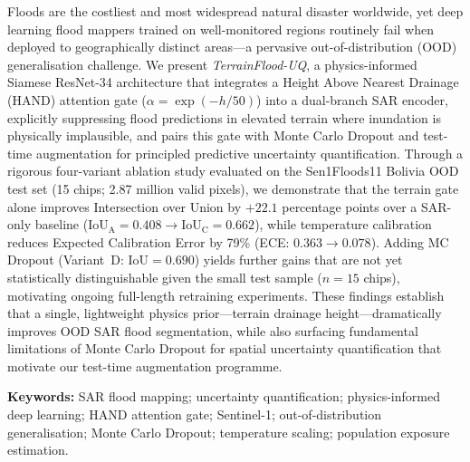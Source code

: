 \documentclass[12pt]{article}
\newcommand{\IoU}{\mathrm{IoU}}
\begin{document}
Floods are the costliest and most widespread natural disaster worldwide, yet
deep learning flood mappers trained on well-monitored regions routinely fail
when deployed to geographically distinct areas—a pervasive out-of-distribution
(OOD) generalisation challenge.
%
We present \textit{TerrainFlood-UQ}, a physics-informed Siamese ResNet-34
architecture that integrates a Height Above Nearest Drainage (HAND) attention
gate ($\alpha = \exp(-h/50)$) into a dual-branch SAR encoder, explicitly
suppressing flood predictions in elevated terrain where inundation is
physically implausible, and pairs this gate with Monte Carlo Dropout and
test-time augmentation for principled predictive uncertainty quantification.
%
Through a rigorous four-variant ablation study evaluated on the Sen1Floods11
Bolivia OOD test set (15 chips; 2.87 million valid pixels), we demonstrate
that the terrain gate alone improves Intersection over Union by $+22.1$
percentage points over a SAR-only baseline ($\IoU_\text{A}=0.408 \to
\IoU_\text{C}=0.662$), while temperature calibration reduces Expected
Calibration Error by 79\% (ECE: $0.363 \to 0.078$).
%
Adding MC Dropout (Variant~D: $\IoU=0.690$) yields further gains that
are not yet statistically distinguishable given the small test sample
($n=15$ chips), motivating ongoing full-length retraining experiments.
%
These findings establish that a single, lightweight physics prior—terrain
drainage height—dramatically improves OOD SAR flood segmentation, while also
surfacing fundamental limitations of Monte Carlo Dropout for spatial
uncertainty quantification that motivate our test-time augmentation programme.

\vspace{0.8em}
\noindent\textbf{Keywords:} SAR flood mapping; uncertainty quantification;
physics-informed deep learning; HAND attention gate; Sentinel-1;
out-of-distribution generalisation; Monte Carlo Dropout; temperature scaling;
population exposure estimation.

\newpage
\tableofcontents

\newpage
\listoffigures

\newpage
\listoftables

\newpage
{}
\setcounter{page}{1}
\end{document}
